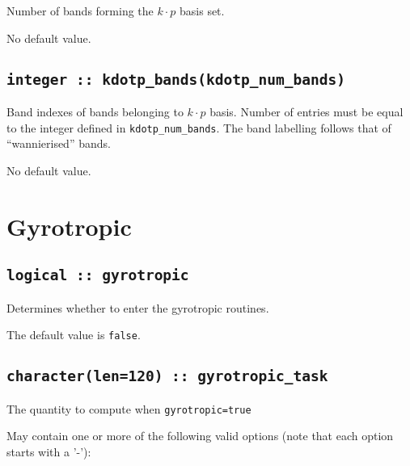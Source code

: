 Number of bands forming the $k\cdot p$ basis set.


No default value.


\subsection{\tt integer  :: kdotp\_bands(kdotp\_num\_bands)}

Band indexes of bands belonging to $k\cdot p$ basis. Number of entries must
be equal to the integer defined in {\tt kdotp\_num\_bands}. 
The band labelling follows that of ``wannierised'' bands.

No default value.

\clearpage
\section{Gyrotropic}

\subsection[gyrotropic]{\tt logical :: gyrotropic}
Determines whether to enter the gyrotropic routines.

The default value is \verb#false#.


\subsection[gyrotropic\_task]{\tt character(len=120) ::  gyrotropic\_task}
The quantity to compute when {\tt gyrotropic=true}

May contain one or more of the following valid options (note that each option starts with a '-'):


